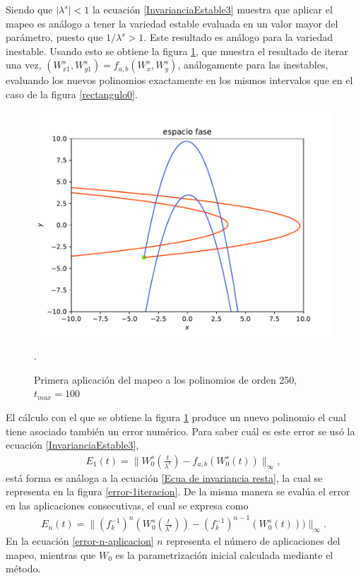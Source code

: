 Siendo que $\vert \lambda^{s} \vert < 1 $ la ecuación \eqref{InvarianciaEstable3} muestra que aplicar el mapeo es análogo a tener la variedad estable evaluada en un valor mayor del parámetro, puesto que $1/\lambda^{s}>1$. Este resultado es análogo para la variedad inestable. Usando esto se obtiene la figura \ref{Rectangulo1}, que muestra el resultado de iterar una vez, $(W_{x1}^{s},W_{y1}^{s})=f_{a,b}(W_{x}^{s},W_{y}^{s})$, análogamente para las inestables, evaluando los nuevos polinomios exactamente en los mismos intervalos que en el caso de la figura \ref{rectangulo0}.
\begin{figure}[H]
\centering
\includegraphics[scale=0.7]{rectangulo1.pdf}
\caption{Primera aplicación del mapeo a los polinomios de orden 250, $t_{max}=100$}.
\label{Rectangulo1}
\end{figure}
El cálculo con el que se obtiene la figura \ref{Rectangulo1} produce un nuevo polinomio el cual tiene asociado también un error numérico. Para saber cuál es este error se usó la ecuación \eqref{InvarianciaEstable3},
\begin{eqnarray}
E_{1}(t)=\bigg\| W_{0}^{s}\left(\frac{t}{\lambda^{s}}\right)-f_{a,b}(W_{0}^{s}(t))\bigg\|_{\infty},
\label{error-1aplicacion}
\end{eqnarray}
está forma es análoga a la ecuación \eqref{Ecua de invariancia resta}, la cual se representa en la figura \ref{error-1iteracion}. De la misma manera se evalúa el error en las aplicaciones consecutivas, el cual se expresa como
\begin{eqnarray}
E_{n}(t)=\bigg\| (f^{-1}_{k})^{n}\left(W_{0}^{s}\left(\frac{t}{\lambda^{s}}\right)\right)- (f^{-1}_{k})^{n-1}(W_{0}^{s}(t)))\bigg\|_{\infty}.
\label{error-n-aplicacion}
\end{eqnarray}
En la ecuación \eqref{error-n-aplicacion} $n$ representa el número de aplicaciones del mapeo, mientras que $W_{0}$ es la parametrización inicial calculada mediante el método.

